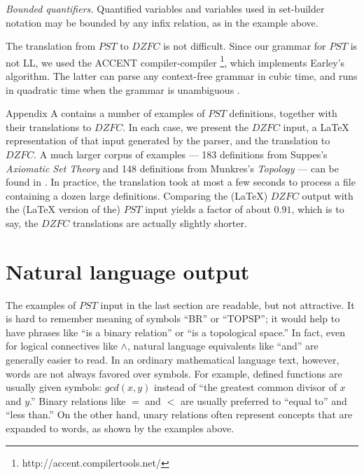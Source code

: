\documentclass{llncs}
\newcommand{\na}[1]{\mathit{#1}}    \newcommand{\fn}[1]{\mathit{#1}}    \newcommand{\ax}[1]{\mathit{(#1)}}  \newcommand{\mdl}[1]{\mathcal{#1}}
\begin{document}
\noindent \emph{Bounded quantifiers.} Quantified variables and
variables used in set-builder notation may be bounded by any infix
relation, as in the example above.

\bigskip

The translation from $\na{PST}$ to $\na{DZFC}$ is not difficult. Since
our grammar for $\na{PST}$ is not LL, we used the ACCENT compiler-compiler
\footnote{http://accent.compilertools.net/}, which implements
Earley's algorithm. The latter can parse any context-free grammar in
cubic time, and runs in quadratic time when the grammar is unambiguous
\cite{aho:ullman}.

Appendix A contains a number of examples of $\na{PST}$ definitions,
together with their translations to $\na{DZFC}$. In each case, we
present the $\na{DZFC}$ input, a \LaTeX{} representation of that input
generated by the parser, and the translation to $\na{DZFC}$. A much
larger corpus of examples --- 183 definitions from Suppes's
\emph{Axiomatic Set Theory} \cite{suppes} and 148 definitions from
Munkres's \emph{Topology} \cite{munkres} --- can be found in
\cite{kieffer:07}. In practice, the translation took at most a few
seconds to process a file containing a dozen large
definitions. Comparing the (\LaTeX{}) $\na{DZFC}$ output with the (\LaTeX{}
version of the) $\na{PST}$ input yields a factor of about $0.91$,
which is to say, the $\na{DZFC}$ translations are actually slightly
shorter.

\section{Natural language output}
\label{NLoutputSection}

The examples of $\na{PST}$ input in the last section are readable, but
not attractive. It is hard to remember meaning of symbols ``BR'' or
``TOPSP''; it would help to have phrases like ``is a binary relation''
or ``is a topological space.'' In fact, even for logical connectives
like $\land$, natural language equivalents like ``and'' are generally
easier to read. In an ordinary mathematical language text, however,
words are not always favored over symbols. For example, defined
functions are usually given symbols: $\fn{gcd}(x,y)$ instead of ``the
greatest common divisor of $x$ and $y$.'' Binary relations like $=$
and $<$ are usually preferred to ``equal to'' and ``less than.'' On
the other hand, unary relations often represent concepts that are
expanded to words, as shown by the examples above.
\end{document}

